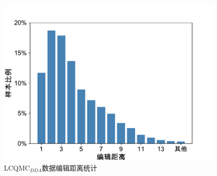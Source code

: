 \begin{figure}
    \centering
      \includegraphics[scale=0.5]{figure/fig4-1.pdf}
    \caption{LCQMC$_{DDA}$数据编辑距离统计}
    \label{fig4-1}
\end{figure}